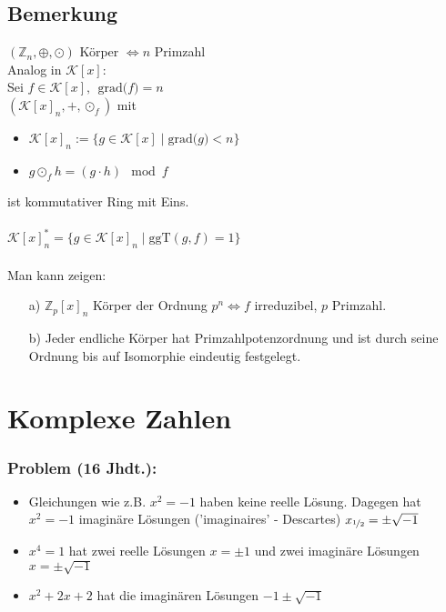 \documentclass[a4paper, 12pt,titlepage, pdf, headsepline]{article}
\newcommand{\grad}[1]{\textrm{grad(}#1\textrm{)}}
\newcommand{\K}{\mathcal{K}}
\renewcommand{\>}{\rightarrow}
\renewcommand{\*}{\cdot}
\begin{document}
		      	\subsection{Bemerkung}
		      	\label{4.40}
		      	$(\mathds{Z}_n, \oplus, \odot)$ Körper $\Leftrightarrow n$ Primzahl \\
		      	Analog in $\K[x]$: \\
		      	Sei $f \in \K[x], ~~\grad{f} = n$ \\
		      	$(\K[x]_n, + , \odot_f)$ mit 
		      	\begin{itemize}
		      		\item $\K[x]_n := \{g \in \K[x] \mid \grad{g} < n \}$
		      		\item $g \odot_f h = (g \cdot h) \mod f$
		      	\end{itemize}
		      	ist kommutativer Ring mit Eins.\\
		      	\\
		      	$\K[x]_n^* = \{g \in \K[x]_n \mid \text{ggT}(g,f) = 1 \}$\\
		      	\\
		      	Man kann zeigen: 
		      	\begin{itemize}
		      		\item[a)] $\mathds{Z}_p[x]_n$ Körper der Ordnung $p^n \Leftrightarrow f$ irreduzibel, $p$ Primzahl.
		      		\item[b)] Jeder endliche Körper hat Primzahlpotenzordnung und ist durch seine Ordnung bis auf Isomorphie eindeutig festgelegt.
		      	\end{itemize}
		      	\newpage
		      	\section{Komplexe Zahlen}
		      	\label{5}
		      	\subsubsection*{Problem (16 Jhdt.):} 
		      	\begin{itemize}
		      		\item Gleichungen wie z.B. $x^2 = -1$ haben keine reelle Lösung. Dagegen hat\\ $x^2 = -1$ imaginäre Lösungen ('imaginaires' - Descartes) $x_{\nicefrac{1}{2}} = \pm \sqrt{-1}$
		      		\item $x^4 = 1$ hat zwei reelle Lösungen $x = \pm 1$ und zwei imaginäre Lösungen $x = \pm \sqrt{-1}$
		      		\item $x^2 + 2x +2$ hat die imaginären Lösungen $-1 \pm \sqrt{-1}$
		      	\end{itemize}
\end{document}
